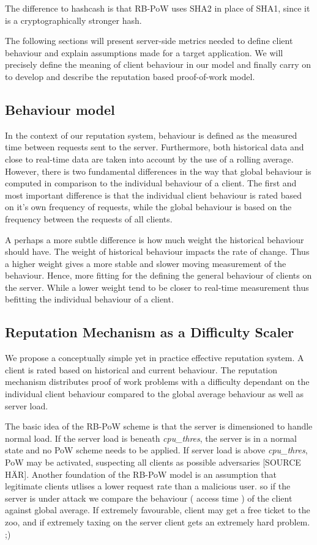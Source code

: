 The difference to hashcash is that RB-PoW uses SHA2 in place of SHA1, since it is a cryptographically stronger hash. 


The following sections will present server-side metrics needed to define client behaviour and explain assumptions made for a target application. 
We will precisely define the meaning of client behaviour in our model and finally carry on to develop and describe the reputation based proof-of-work model.



\subsection{Behaviour model}\label{tab:behaviourmodel}
In the context of our reputation system, behaviour is defined as the measured time between requests sent to the server. Furthermore, both historical data and close to real-time data are taken into account by the use of a rolling average. However, there is two fundamental differences in the way that global behaviour is computed in comparison to the individual behaviour of a client. The first and most important difference is that the individual client behaviour is rated based on it's own frequency of requests, while the global behaviour is based on the frequency between the requests of all clients. 

A perhaps a more subtle difference is how much weight the historical behaviour should have. The weight of historical behaviour impacts the rate of change. Thus a higher weight gives a more stable and slower moving measurement of the behaviour. Hence, more fitting for the defining the general behaviour of clients on the server. While a lower weight tend to be closer to real-time measurement thus befitting the individual behaviour of a client.

\subsection{Reputation Mechanism as a Difficulty Scaler}
We propose a conceptually simple yet in practice effective reputation system. A client is rated based on historical and current behaviour. The reputation mechanism distributes proof of work problems with a difficulty dependant on the individual client behaviour compared to the global average behaviour as well as server load. 

The basic idea of the RB-PoW scheme is that the server is dimensioned to handle normal load. If the server load is beneath \emph{cpu\_thres}, the server is in a normal state and no PoW scheme needs to be applied. If server load is above {\em cpu\_thres}, PoW may be activated, suspecting all clients as possible adversaries [SOURCE HÄR]. Another foundation of the RB-PoW model is an assumption that legitimate clients utlises a lower request rate than a malicious user. so if the server is under attack we compare the behaviour ( access time ) of the client against global average. If extremely favourable, client may get a free ticket to the zoo, and if extremely taxing on the server client gets an extremely hard problem.  ;)
